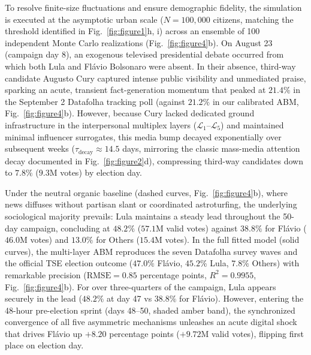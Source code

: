 \documentclass{article}
\begin{document}
To resolve finite-size fluctuations and ensure demographic fidelity, the simulation is executed at the asymptotic urban scale ($N = 100{,}000$ citizens, matching the threshold identified in Fig.~\ref{fig:figure1}h, i) across an ensemble of 100 independent Monte Carlo realizations (Fig.~\ref{fig:figure4}b). On August 23 (campaign day 8), an exogenous televised presidential debate occurred from which both Lula and Fl{\'a}vio Bolsonaro were absent. In their absence, third-way candidate Augusto Cury captured intense public visibility and unmediated praise, sparking an acute, transient fact-generation momentum that peaked at $21.4\%$ in the September 2 Datafolha tracking poll (against $21.2\%$ in our calibrated ABM, Fig.~\ref{fig:figure4}b). However, because Cury lacked dedicated ground infrastructure in the interpersonal multiplex layers ($\mathcal{L}_1$--$\mathcal{L}_5$) and maintained minimal influencer surrogates, this media bump decayed exponentially over subsequent weeks ($\tau_{\mathrm{decay}} \approx 14.5$ days, mirroring the classic mass-media attention decay documented in Fig.~\ref{fig:figure2}d), compressing third-way candidates down to $7.8\%$ ($9.3\mathrm{M}$ votes) by election day.

Under the neutral organic baseline (dashed curves, Fig.~\ref{fig:figure4}b), where news diffuses without partisan slant or coordinated astroturfing, the underlying sociological majority prevails: Lula maintains a steady lead throughout the 50-day campaign, concluding at $48.2\%$ ($57.1\mathrm{M}$ valid votes) against $38.8\%$ for Fl{\'a}vio ($46.0\mathrm{M}$ votes) and $13.0\%$ for Others ($15.4\mathrm{M}$ votes). In the full fitted model (solid curves), the multi-layer ABM reproduces the seven Datafolha survey waves and the official TSE election outcome ($47.0\%$ Fl{\'a}vio, $45.2\%$ Lula, $7.8\%$ Others) with remarkable precision ($\mathrm{RMSE} = 0.85$ percentage points, $R^2 = 0.9955$, Fig.~\ref{fig:figure4}b). For over three-quarters of the campaign, Lula appears securely in the lead ($48.2\%$ at day 47 vs $38.8\%$ for Fl{\'a}vio). However, entering the 48-hour pre-election sprint (days 48--50, shaded amber band), the synchronized convergence of all five asymmetric mechanisms unleashes an acute digital shock that drives Fl{\'a}vio up $+8.20$ percentage points ($+9.72\mathrm{M}$ valid votes), flipping first place on election day.
\end{document}
